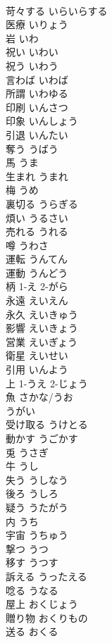 \documentclass[8pt]{extreport}
\begin{document}
\begin{CJK}{UTF8}{min}
\\	苛々する	いらいらする	
\\	医療	いりょう	
\\	岩	いわ	
\\	祝い	いわい	
\\	祝う	いわう	
\\	言わば	いわば	
\\	所謂	いわゆる	
\\	印刷	いんさつ	
\\	印象	いんしょう	
\\	引退	いんたい	
\\	奪う	うばう	
\\	馬	うま	
\\	生まれ	うまれ	
\\	梅	うめ	
\\	裏切る	うらぎる	
\\	煩い	うるさい	
\\	売れる	うれる	
\\	噂	うわさ	
\\	運転	うんてん	
\\	運動	うんどう	
\\	柄	1-え 2-がら	
\\	永遠	えいえん	
\\	永久	えいきゅう	
\\	影響	えいきょう	
\\	営業	えいぎょう	
\\	衛星	えいせい	
\\	引用	いんよう	
\\	上	1-うえ 2-じょう	
\\	魚	さかな/うお	
\\	うがい		
\\	受け取る	うけとる	
\\	動かす	うごかす	
\\	兎	うさぎ	
\\	牛	うし	
\\	失う	うしなう	
\\	後ろ	うしろ	
\\	疑う	うたがう	
\\	内	うち	
\\	宇宙	うちゅう	
\\	撃つ	うつ	
\\	移す	うつす	
\\	訴える	うったえる	
\\	唸る	うなる	
\\	屋上	おくじょう	
\\	贈り物	おくりもの	
\\	送る	おくる	

\end{CJK}
\end{document}
